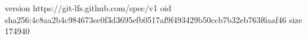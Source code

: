 version https://git-lfs.github.com/spec/v1
oid sha256:4c8aa2b4c984673ec0f3d3695efb0517af9f493429b50ccb7b32eb763f6aaf46
size 174940
